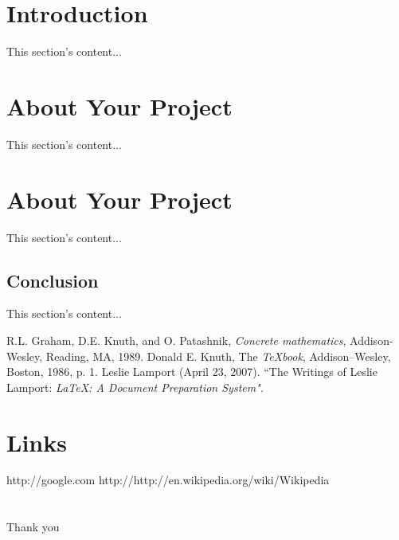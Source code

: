 \documentclass[12pt]{myclass}
\begin{document}
\section{Introduction}
This section's content...

\section{About Your Project}
This section's content...

\section{About Your Project}
This section's content...

\begin{print}
\section{Conclusion}                                %
This section's content...

\begin{thebibliography}{9}

R.L. Graham, D.E. Knuth, and O. Patashnik, \emph{Concrete
mathematics}, Addison-Wesley, Reading, MA, 1989.
Donald E. Knuth, The \emph{TeXbook}, Addison–Wesley, Boston, 1986, p. 1.
Leslie Lamport (April 23, 2007). ``The Writings of Leslie Lamport: \emph{LaTeX: A Document Preparation System".}


\end{thebibliography}
\end{print}
\begin{screen}
\section{Links}
 http://google.com
\newline
http://http://en.wikipedia.org/wiki/Wikipedia

\section*{}
\begin{center}
Thank you
\end{center}
\end{screen}
\end{document}
